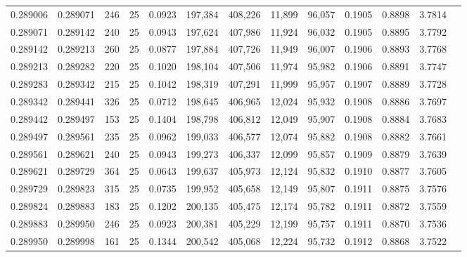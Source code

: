 \begin{tabular}{rrrrrrrrrrrrr}
0.289006 & 0.289071 &   246 &  25 &                                     0.0923 & 197,384 & 408,226 &  11,899 &  96,057 & 0.1905 & 0.8898 & 3.7814 \\
0.289071 & 0.289142 &   240 &  25 &                                     0.0943 & 197,624 & 407,986 &  11,924 &  96,032 & 0.1905 & 0.8895 & 3.7792 \\
0.289142 & 0.289213 &   260 &  25 &                                     0.0877 & 197,884 & 407,726 &  11,949 &  96,007 & 0.1906 & 0.8893 & 3.7768 \\
0.289213 & 0.289282 &   220 &  25 &                                     0.1020 & 198,104 & 407,506 &  11,974 &  95,982 & 0.1906 & 0.8891 & 3.7747 \\
0.289283 & 0.289342 &   215 &  25 &                                     0.1042 & 198,319 & 407,291 &  11,999 &  95,957 & 0.1907 & 0.8889 & 3.7728 \\
0.289342 & 0.289441 &   326 &  25 &                                     0.0712 & 198,645 & 406,965 &  12,024 &  95,932 & 0.1908 & 0.8886 & 3.7697 \\
0.289442 & 0.289497 &   153 &  25 &                                     0.1404 & 198,798 & 406,812 &  12,049 &  95,907 & 0.1908 & 0.8884 & 3.7683 \\
0.289497 & 0.289561 &   235 &  25 &                                     0.0962 & 199,033 & 406,577 &  12,074 &  95,882 & 0.1908 & 0.8882 & 3.7661 \\
0.289561 & 0.289621 &   240 &  25 &                                     0.0943 & 199,273 & 406,337 &  12,099 &  95,857 & 0.1909 & 0.8879 & 3.7639 \\
0.289621 & 0.289729 &   364 &  25 &                                     0.0643 & 199,637 & 405,973 &  12,124 &  95,832 & 0.1910 & 0.8877 & 3.7605 \\
0.289729 & 0.289823 &   315 &  25 &                                     0.0735 & 199,952 & 405,658 &  12,149 &  95,807 & 0.1911 & 0.8875 & 3.7576 \\
0.289824 & 0.289883 &   183 &  25 &                                     0.1202 & 200,135 & 405,475 &  12,174 &  95,782 & 0.1911 & 0.8872 & 3.7559 \\
0.289883 & 0.289950 &   246 &  25 &                                     0.0923 & 200,381 & 405,229 &  12,199 &  95,757 & 0.1911 & 0.8870 & 3.7536 \\
0.289950 & 0.289998 &   161 &  25 &                                     0.1344 & 200,542 & 405,068 &  12,224 &  95,732 & 0.1912 & 0.8868 & 3.7522 \\

\end{tabular}
